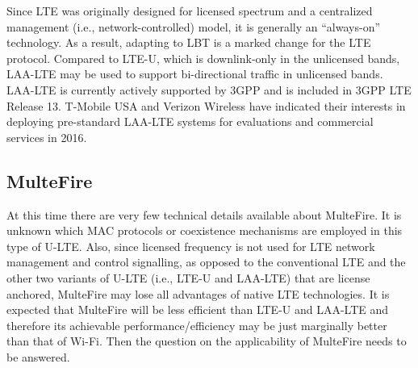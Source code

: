 Since LTE was originally designed for licensed spectrum and a centralized management (i.e., network-controlled) model, it is generally an ``always-on'' technology. As a result, adapting to LBT is a marked change for the LTE protocol. Compared to \mbox{LTE-U}, which is downlink-only in the unlicensed bands, \mbox{LAA-LTE} may be used to support bi-directional traffic in unlicensed bands. \mbox{LAA-LTE} is currently actively supported by 3GPP and is included in 3GPP LTE Release 13. T-Mobile USA and Verizon Wireless have indicated their interests in deploying pre-standard \mbox{LAA-LTE} systems for evaluations and commercial services in 2016.



\subsection{MulteFire}
At this time there are very few technical details available about MulteFire. It is unknown which MAC protocols or coexistence mechanisms are employed in this type of \mbox{U-LTE}. Also, since licensed frequency is not used for LTE network management and control signalling, as opposed to the conventional LTE and the other two variants of \mbox{U-LTE} (i.e., \mbox{LTE-U} and \mbox{LAA-LTE}) that are license anchored, MulteFire may lose all advantages of native LTE technologies. It is expected that MulteFire will be less efficient than \mbox{LTE-U} and \mbox{LAA-LTE} and therefore its achievable performance/efficiency may be just marginally better than that of \mbox{Wi-Fi}. Then the question on the applicability of MulteFire needs to be answered.


